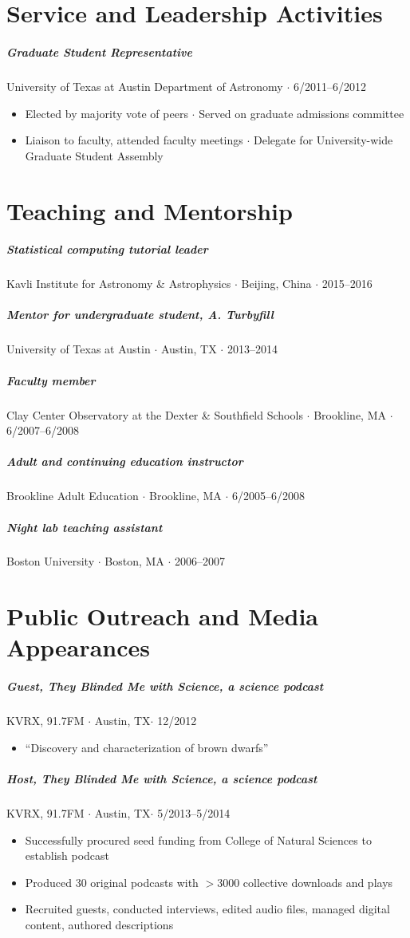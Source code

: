 \documentclass[10pt,letterpaper]{article}
\begin{document}
\section*{Service and Leadership Activities}

\subparagraph{Graduate Student Representative}
University of Texas at Austin Department of Astronomy $\cdot$ 6/2011--6/2012
\begin{itemize}
    \item Elected by majority vote of peers $\cdot$ Served on graduate admissions committee
    \item Liaison to faculty, attended faculty meetings $\cdot$ Delegate for University-wide Graduate Student Assembly
\end{itemize}

\section*{Teaching and Mentorship}

\subparagraph{Statistical computing tutorial leader} 
Kavli Institute for Astronomy \& Astrophysics $\cdot$ Beijing, China $\cdot$ 2015--2016


\subparagraph{Mentor for undergraduate student, A. Turbyfill} 
University of Texas at Austin $\cdot$ Austin, TX $\cdot$ 2013--2014

\subparagraph{Faculty member}
Clay Center Observatory at the Dexter \& Southfield Schools  $\cdot$ Brookline, MA $\cdot$ 6/2007--6/2008

\subparagraph{Adult and continuing education instructor}
Brookline Adult Education  $\cdot$ Brookline, MA $\cdot$ 6/2005--6/2008

\subparagraph{Night lab teaching assistant} 
Boston University $\cdot$ Boston, MA $\cdot$ 2006--2007

\section*{Public Outreach and Media Appearances}

\subparagraph{Guest, They Blinded Me with Science, a science podcast}
KVRX, 91.7FM $\cdot$ Austin, TX$\cdot$ 12/2012
	\begin{itemize}
	    \item ``Discovery and characterization of brown dwarfs''
	\end{itemize}
	
\subparagraph{Host, They Blinded Me with Science, a science podcast}
KVRX, 91.7FM $\cdot$ Austin, TX$\cdot$ 5/2013--5/2014
	\begin{itemize}
	    \item Successfully procured seed funding from College of Natural Sciences to establish podcast
	    \item Produced 30 original podcasts with $>3000$ collective downloads and plays
	    \item Recruited guests, conducted interviews, edited audio files, managed digital content, authored descriptions
	\end{itemize}
\end{document}
